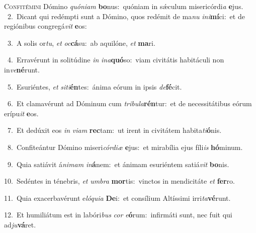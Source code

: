 \lettrine{\initial\textcolor{\initialcolor}{C}}{onfitémini} Dómino \textit{quón}\-\textit{i}\textit{am} \textbf{bo}\-nus:~\star quóniam in sǽculum misericórdi\textit{a} \textbf{e}\-jus.\\
{\numbfont\textcolor{\numbcolor}{~2.}}~Dicant qui redémpti sunt a Dómino, quos redémit de ma\textit{nu} \textit{in}\-\textit{i}\textbf{mí}ci:~\star et de regiónibus congregá\textit{vit} \textbf{e}\-os:\par
{\numbfont\textcolor{\numbcolor}{~3.}}~A solis or\-\textit{tu}\-, \textit{et} \textit{oc}\-\textbf{cá}su:~\star ab aquilóne, \textit{et} \textbf{ma}\-ri.\par
{\numbfont\textcolor{\numbcolor}{~4.}}~Erravérunt in solitúdine \textit{in} \textit{in}\-\textit{a}\textbf{quó}so:~\star viam civitátis habitáculi non in\-\textit{ve}\-\textbf{né}runt.\par
{\numbfont\textcolor{\numbcolor}{~5.}}~Esuriéntes, \textit{et} \textit{si}\-\textit{ti}\textbf{én}tes:~\star ánima eórum in ipsis \textit{de}\-\textbf{fé}cit.\par
{\numbfont\textcolor{\numbcolor}{~6.}}~Et clamavérunt ad Dóminum cum \textit{tri}\-\textit{bu}\textit{la}\textbf{rén}tur:~\star et de necessitátibus eórum erípu\textit{it} \textbf{e}\-os.\par
{\numbfont\textcolor{\numbcolor}{~7.}}~Et dedúxit eos \textit{in} \textit{vi}\-\textit{am} \textbf{rec}\-tam:~\star ut irent in civitátem habita\-\textit{ti}\-\textbf{ó}nis.\par
{\numbfont\textcolor{\numbcolor}{~8.}}~Confiteántur Dómino miseri\-\textit{cór}\-\textit{di}\textit{æ} \textbf{e}\-jus:~\star et mirabília ejus fíli\textit{is} \textbf{hó}\-minum.\par
{\numbfont\textcolor{\numbcolor}{~9.}}~Quia satiávit á\-\textit{ni}\-\textit{mam} \textit{in}\-\textbf{á}nem:~\star et ánimam esuriéntem satiá\textit{vit} \textbf{bo}\-nis.\par
{\numbfont\textcolor{\numbcolor}{10.}}~Sedéntes in ténebris, \textit{et} \textit{um}\-\textit{bra} \textbf{mor}\-tis:~\star vinctos in mendicitáte \textit{et} \textbf{fer}\-ro.\par
{\numbfont\textcolor{\numbcolor}{11.}}~Quia exacerbavérunt e\-\textit{ló}\-\textit{qui}\textit{a} \textbf{De}\-i:~\star et consílium Altíssimi irri\-\textit{ta}\-\textbf{vé}runt.\par
{\numbfont\textcolor{\numbcolor}{12.}}~Et humiliátum est in labóri\textit{bus} \textit{cor} \textit{e}\-\textbf{ó}rum:~\star infirmáti sunt, nec fuit qui ad\-\textit{ju}\-\textbf{vá}ret.\par
